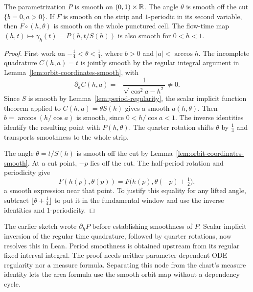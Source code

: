 \begin{lemma}
\label{lem:action-angle-regularity}
\leanok
The parametrization $P$ is smooth on $(0,1)\times\mathbb{R}$. The angle $\theta$
is smooth off the cut $\{b=0,a>0\}$. If $F$ is smooth on the strip and
$1$-periodic in its second variable, then $F\circ(h,\theta)$ is smooth
on the whole punctured cell. The flow-time map
$(h,t)\mapsto\gamma_h(t)=P(h,t/S(h))$ is also smooth for $0<h<1$.
\end{lemma}

\begin{proof}
\leanok
First work on $-\frac14<\theta<\frac14$, where $b>0$ and $|a|<\arccos h$.
The incomplete quadrature $C(h,a)=t$ is jointly smooth by the regular
integral argument in Lemma~\ref{lem:orbit-coordinates-smooth}, with
\[
  \partial_a C(h,a)=-\frac1{\sqrt{\cos^2a-h^2}}\ne0.
\]
Since $S$ is smooth by Lemma~\ref{lem:period-regularity}, the scalar
implicit function theorem applied to $C(h,a)=\theta S(h)$ gives a
smooth $a(h,\theta)$. Then $b=\arccos(h/\cos a)$ is smooth, since
$0<h/\cos a<1$. The inverse identities identify the resulting point
with $P(h,\theta)$. The quarter rotation shifts $\theta$ by $\frac14$
and transports smoothness to the whole strip.

The angle $\theta=t/S(h)$ is smooth off the cut by
Lemma~\ref{lem:orbit-coordinates-smooth}. At a cut point, $-p$ lies off
the cut. The half-period rotation and periodicity give
\[
  F(h(p),\theta(p))=F\bigl(h(p),\theta(-p)+\tfrac12\bigr),
\]
a smooth expression near that point. To justify this equality for any
lifted angle, subtract $\lfloor\theta+\frac14\rfloor$ to put it in the
fundamental window and use the inverse identities and $1$-periodicity.
\end{proof}

\begin{remark}
The earlier sketch wrote $\partial_hP$ before establishing smoothness
of $P$. Scalar implicit inversion of the regular time quadrature,
followed by quarter rotations, now resolves this in Lean. Period
smoothness is obtained upstream from its regular fixed-interval integral.
The proof needs neither parameter-dependent ODE regularity nor a measure
formula. Separating this node from the chart's measure identity lets the
area formula use the smooth orbit map without a dependency cycle.
\end{remark}

